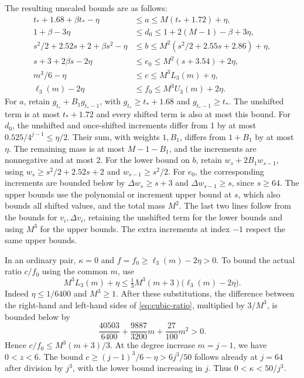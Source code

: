 The resulting unscaled bounds are as follows:
\begin{equation}
\begin{aligned}
 t_*+1.68+\beta t_*-\eta &\le a \le M(t_*+1.72)+\eta,\\
 1+\beta-3\eta &\le d_0\le1+2(M-1)-\beta+3\eta,\\
 s^2/2+2.52s+2+\beta s^2-\eta &\le b
                   \le M^2(s^2/2+2.55s+2.86)+\eta,\\
 s+3+2\beta s-2\eta &\le e_0\le M^2(s+3.54)+2\eta,\\
 m^3/6-\eta &\le c \le M^3 L_3(m)+\eta,\\
 \ell_3(m)-2\eta &\le f_0\le M^3 U_3(m)+2\eta .
\end{aligned}
\tag{8}
\label{eq:cubic-bounds}
\end{equation}
For \(a\), retain \(g_{t_*}+B_1g_{t_*-1}\), with \(g_{t_*}\ge t_*+1.68\)
and \(g_{t_*-1}\ge t_*\). The unshifted term is at most \(t_*+1.72\)
and every shifted term is also at most this bound. For \(d_0\), the
unshifted and once-shifted increments differ from 1 by at most
\(0.525/4^{j-1}\le\eta/2\). Their sum, with weights \(1,B_1\), differs
from \(1+B_1\) by at most \(\eta\). The remaining mass is at most
\(M-1-B_1\), and the increments are nonnegative and at most 2.
For the lower bound on \(b\), retain \(w_s+2B_1w_{s-1}\), using
\(w_s\ge s^2/2+2.52s+2\) and \(w_{s-1}\ge s^2/2\).
For \(e_0\), the corresponding increments are bounded below by
\(\Delta w_s\ge s+3\) and \(\Delta w_{s-1}\ge s\), since \(s\ge64\).
The upper bounds use the polynomial or increment upper bound at \(s\),
which also bounds all shifted values, and the total mass \(M^2\).
The last two lines follow from the bounds for \(v_i,\Delta v_i\),
retaining the unshifted term for the lower bounds and using \(M^3\)
for the upper bounds. The extra increments at index \(-1\) respect
the same upper bounds.

In an ordinary pair, \(\kappa=0\) and \(f=f_0\ge\ell_3(m)-2\eta>0\).
To bound the actual ratio \(c/f_0\) using the common \(m\), use
\begin{equation}
 M^3L_3(m)+\eta
 \le \tfrac13 M^3(m+3)\bigl(\ell_3(m)-2\eta\bigr).
 \tag{9}
 \label{eq:cubic-ratio}
\end{equation}
Indeed \(\eta\le1/6400\) and \(M^3\ge1\).
After these substitutions, the difference between the right-hand and
left-hand sides of \eqref{eq:cubic-ratio}, multiplied by \(3/M^3\),
is bounded below by
\[
 \frac{40503}{6400}+\frac{9887}{3200}m+\frac{27}{100}m^2>0.
\]
Hence \(c/f_0\le M^3(m+3)/3\).
At the degree increase \(m=j-1\), we have \(0<z<6\).
The bound \(c\ge(j-1)^3/6-\eta>6j^3/50\) follows
already at \(j=64\) after division by \(j^3\), with the lower bound
increasing in \(j\). Thus \(0<\kappa<50/j^3\).

